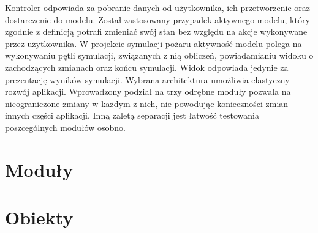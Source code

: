 Kontroler odpowiada za pobranie danych od użytkownika, ich przetworzenie oraz dostarczenie do modelu.
Został zastosowany przypadek aktywnego modelu, który zgodnie z definicją potrafi zmieniać swój stan 
bez względu na akcje wykonywane przez użytkownika. W projekcie symulacji pożaru aktywność modelu polega na 
wykonywaniu pętli symulacji, związanych z nią obliczeń, powiadamianiu widoku o zachodzących zmianach oraz
końcu symulacji. Widok odpowiada jedynie za prezentację wyników symulacji.
Wybrana architektura umożliwia elastyczny rozwój aplikacji. Wprowadzony podział na trzy odrębne moduły pozwala
na nieograniczone zmiany w każdym z nich, nie powodując konieczności zmian innych części aplikacji.
Inną zaletą separacji jest łatwość testowania poszcególnych modułów osobno. 
\section {Moduły}
\section {Obiekty}
